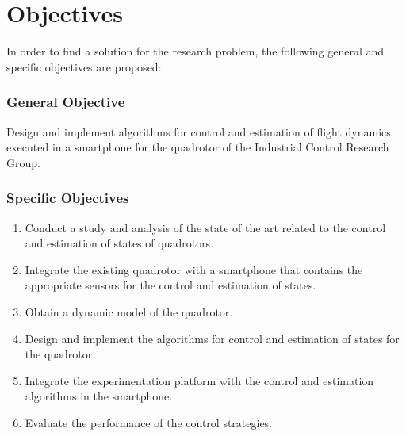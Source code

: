 \section{Objectives}
In order to find a solution for the research problem, the following general and specific objectives are proposed:
\subsubsection{General Objective}
Design and implement algorithms for control and estimation of flight dynamics executed in a smartphone for the quadrotor of the Industrial Control Research Group.
\subsubsection{Specific Objectives}
\begin{enumerate}
\item Conduct a study and analysis of the state of the art related to the control and estimation of states of quadrotors.
\item Integrate the existing quadrotor with a smartphone that contains the appropriate sensors for the control and estimation of states.
\item Obtain a dynamic model of the quadrotor.
\item Design and implement the algorithms for control and estimation of states for the quadrotor.
\item Integrate the experimentation platform with the control and estimation algorithms in the smartphone.
\item Evaluate the performance of the control strategies.%
\end{enumerate}

